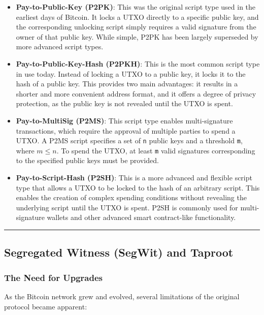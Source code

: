 \begin{itemize}
	\item
	\textbf{Pay-to-Public-Key (P2PK)}: This was the original script type
	used in the earliest days of Bitcoin. It locks a UTXO directly to a
	specific public key, and the corresponding unlocking script simply
	requires a valid signature from the owner of that public key. While
	simple, P2PK has been largely superseded by more advanced script
	types.
	\item
	\textbf{Pay-to-Public-Key-Hash (P2PKH)}: This is the most common
	script type in use today. Instead of locking a UTXO to a public key,
	it locks it to the hash of a public key. This provides two main
	advantages: it results in a shorter and more convenient address
	format, and it offers a degree of privacy protection, as the public key is not revealed until the UTXO is spent.
	\item
	\textbf{Pay-to-MultiSig (P2MS)}: This script type enables
	multi-signature transactions, which require the approval of multiple
	parties to spend a UTXO. A P2MS script specifies a set of \texttt{n}
	public keys and a threshold \texttt{m}, where
	$m \leq n$. To spend the UTXO, at least \texttt{m}
	valid signatures corresponding to the specified public keys must be
	provided.
	\item
	\textbf{Pay-to-Script-Hash (P2SH)}: This is a more advanced and
	flexible script type that allows a UTXO to be locked to the hash of an
	arbitrary script. This enables the creation of complex spending
	conditions without revealing the underlying script until the UTXO is
	spent. P2SH is commonly used for multi-signature wallets and other
	advanced smart contract-like functionality.
\end{itemize}

\begin{center}\rule{0.5\linewidth}{0.5pt}\end{center}

\subsection{Segregated Witness (SegWit) and
	Taproot}\label{section-2-segregated-witness-segwit-and-taproot}

\subsubsection{The Need for Upgrades}\label{the-need-for-upgrades}

As the Bitcoin network grew and evolved, several limitations of the
original protocol became apparent: 

